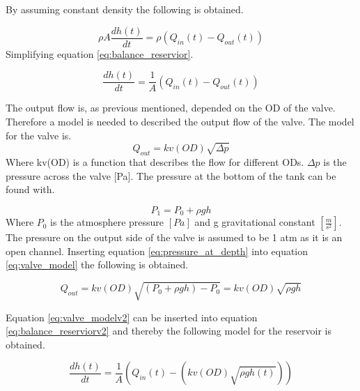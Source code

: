 By assuming constant density the following is obtained.

\begin{equation}\label{eq:balance_reservior}
	\rho A\frac{dh(t)}{dt}=\rho \left(Q_{in}(t)-Q_{out}(t)\right)
\end{equation}
Simplifying equation \ref{eq:balance_reservior}.

\begin{equation}\label{eq:balance_reserviorv2}
	\frac{dh(t)}{dt}=\frac{1}{A} \left(Q_{in}(t)-Q_{out}(t)\right)
\end{equation}

The output flow is, as previous mentioned, depended on the OD of the valve. Therefore a model is needed to described the output flow of the valve. The model for the valve is.
\begin{equation}\label{eq:valve_model}
	Q_{out} = kv(OD) \sqrt{\Delta p}
\end{equation}
Where kv(OD) is a function that describes the flow for different ODs. $\Delta p$ is the pressure across the valve [Pa]. The pressure at the bottom of the tank can be found with.

\begin{equation}\label{eq:pressure_at_depth}
 	P_1 = P_0 +\rho g h
 \end{equation} 
 Where $P_0$ is the atmosphere pressure $[Pa]$ and g gravitational constant $\left[\frac{m}{s^2}\right]$. The pressure on the output side of the valve is assumed to be 1 atm as it is an open channel. Inserting equation \ref{eq:pressure_at_depth} into equation \ref{eq:valve_model} the following is obtained.    


\begin{equation}\label{eq:valve_modelv2}
	Q_{out} = kv(OD) \sqrt{(P_0 +\rho g h)- P_0} = kv(OD) \sqrt{\rho g h} 
\end{equation}

Equation \ref{eq:valve_modelv2} can be inserted into equation \ref{eq:balance_reserviorv2} and thereby the following model for the reservoir is obtained.

\begin{equation}\label{eq:balance_reserviorv3}
	\frac{dh(t)}{dt}=\frac{1}{A} \left(Q_{in}(t)-\left(kv(OD) \sqrt{\rho g h(t)}\right)\right)
\end{equation}
